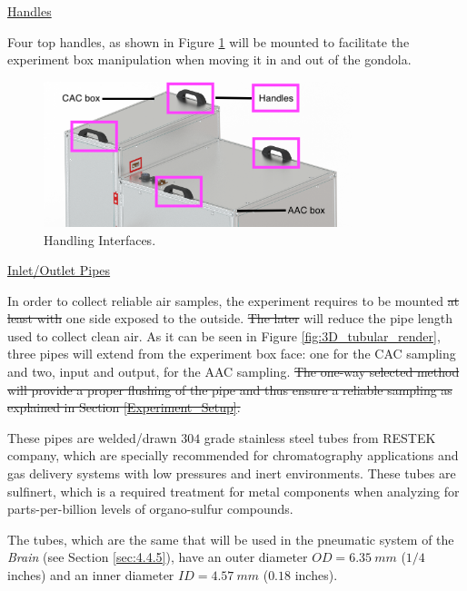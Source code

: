 \documentclass[a4paper,12pt,oneside]{article} %
\providecommand{\DIFaddtex}[1]{{\protect\color{blue}\uwave{#1}}} %
\providecommand{\DIFdeltex}[1]{{\protect\color{red}\sout{#1}}}                      %
\providecommand{\DIFaddbegin}{} %
\providecommand{\DIFaddend}{} %
\providecommand{\DIFdelbegin}{} %
\providecommand{\DIFdelend}{} %
\providecommand{\DIFaddbeginFL}{} %
\providecommand{\DIFaddendFL}{} %
\providecommand{\DIFdelbeginFL}{} %
\providecommand{\DIFdelendFL}{} %
\providecommand{\DIFadd}[1]{\texorpdfstring{\DIFaddtex{#1}}{#1}} %
\providecommand{\DIFdel}[1]{\texorpdfstring{\DIFdeltex{#1}}{}} %
\newcommand{\DIFscaledelfig}{0.5}
\newlength{\DIFdelgraphicswidth} %
\newlength{\DIFdelgraphicsheight} %
\newcommand{\DIFaddincludegraphics}[2][]{{\color{blue}\fbox{\DIFOincludegraphics[#1]{#2}}}} %
\newcommand{\DIFdelincludegraphics}[2][]{%
\sbox{\DIFdelgraphicsbox}{\DIFOincludegraphics[#1]{#2}}%
\settoboxwidth{\DIFdelgraphicswidth}{\DIFdelgraphicsbox} %
\settoboxtotalheight{\DIFdelgraphicsheight}{\DIFdelgraphicsbox} %
\scalebox{\DIFscaledelfig}{%
\parbox[b]{\DIFdelgraphicswidth}{\usebox{\DIFdelgraphicsbox}\\[-\baselineskip] \rule{\DIFdelgraphicswidth}{0em}}\llap{\resizebox{\DIFdelgraphicswidth}{\DIFdelgraphicsheight}{%
\setlength{\unitlength}{\DIFdelgraphicswidth}%
\begin{picture}(1,1)%
\thicklines\linethickness{2pt} %
{\color[rgb]{1,0,0}\put(0,0){\framebox(1,1){}}}%
{\color[rgb]{1,0,0}\put(0,0){\line( 1,1){1}}}%
{\color[rgb]{1,0,0}\put(0,1){\line(1,-1){1}}}%
\end{picture}%
}\hspace*{3pt}}} %
} %
\DeclareRobustCommand{\DIFaddbegin}{\DIFOaddbegin \let\includegraphics\DIFaddincludegraphics} %
\DeclareRobustCommand{\DIFaddend}{\DIFOaddend \let\includegraphics\DIFOincludegraphics} %
\DeclareRobustCommand{\DIFdelbegin}{\DIFOdelbegin \let\includegraphics\DIFdelincludegraphics} %
\DeclareRobustCommand{\DIFdelend}{\DIFOaddend \let\includegraphics\DIFOincludegraphics} %
\DeclareRobustCommand{\DIFaddbeginFL}{\DIFOaddbeginFL \let\includegraphics\DIFaddincludegraphics} %
\DeclareRobustCommand{\DIFaddendFL}{\DIFOaddendFL \let\includegraphics\DIFOincludegraphics} %
\DeclareRobustCommand{\DIFdelbeginFL}{\DIFOdelbeginFL \let\includegraphics\DIFdelincludegraphics} %
\DeclareRobustCommand{\DIFdelendFL}{\DIFOaddendFL \let\includegraphics\DIFOincludegraphics} %
\begin{document}
\bigskip
\underline{Handles}

\smallskip
Four top handles, as shown in Figure \ref{fig:handles} will be mounted to facilitate the experiment box manipulation when moving it in and out of the gondola.

\begin{figure}[H]
    \centering
    \DIFdelbeginFL %
\DIFdelendFL \DIFaddbeginFL \includegraphics[width=0.8\textwidth]{4-experiment-design/img/Mechanical/Figure_8.png}
    \DIFaddendFL \caption{Handling Interfaces.}
    \label{fig:handles}
\end{figure}

\bigskip
\underline{Inlet/Outlet Pipes}
\label{subsec:pipes}

\smallskip
In order to collect reliable air samples, the experiment requires to be mounted \DIFdelbegin \DIFdel{at least with }\DIFdelend \DIFaddbegin \DIFadd{with at least }\DIFaddend one side exposed to the outside. \DIFdelbegin \DIFdel{The later }\DIFdelend \DIFaddbegin \DIFadd{This }\DIFaddend will reduce the pipe length used to collect clean air. As it can be seen in Figure \ref{fig:3D_tubular_render}, three pipes will extend from the experiment box face: one for the CAC sampling and two, input and output, for the AAC sampling. 
\DIFdelbegin \DIFdel{The one-way selected method will provide a proper flushing of the pipe and thus ensure a reliable sampling as explained in Section \ref{Experiment_Setup}.
}\DIFdelend 

These pipes are welded/drawn $304$ grade stainless steel tubes from RESTEK company, which are specially recommended for chromatography applications and gas delivery systems with low pressures and inert environments. These tubes are sulfinert, which is a required treatment for metal components when analyzing for parts-per-billion levels of organo-sulfur compounds.

The tubes, which are the same that will be used in the pneumatic system of the \emph{Brain} (see Section \ref{sec:4.4.5}), have an outer diameter $OD = 6.35\ mm$ ($1/4$ inches) and an inner diameter $ID = 4.57\ mm$ ($0.18$ inches).
\end{document}
